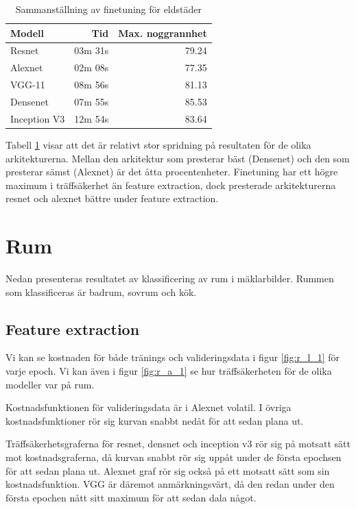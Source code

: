 \documentclass[]{kththesis}
\begin{document}
\begin{table}[!htbp]
  \centering
  \begin{tabular}{|l|r|r|}
    Modell & Tid & Max. noggrannhet \\ 
    \hline
    Resnet       & 03m 31s & 79.24 \\
    Alexnet      & 02m 08s & 77.35 \\
    VGG-11       & 08m 56s & 81.13 \\
    Densenet     & 07m 55s & 85.53 \\
    Inception V3 & 12m 54s & 83.64 \\
  \end{tabular}
  \caption{Sammanställning av finetuning för eldstäder}
  \label{fig:sam_4}  
\end{table}

Tabell \ref{fig:sam_4} visar att det är relativt stor spridning på resultaten för de olika arkitekturerna.
Mellan den arkitektur som presterar bäst (Densenet) och den som presterar sämst (Alexnet) är det åtta procentenheter.
Finetuning har ett högre maximum i träffsäkerhet än feature extraction, dock presterade arkitekturerna resnet och alexnet bättre under feature extraction.

\section{Rum}
Nedan presenteras resultatet av klassificering av rum i mäklarbilder. 
Rummen som klassificeras är badrum, sovrum och kök.


\subsection{Feature extraction}
Vi kan se kostnaden för både tränings och valideringsdata i figur \ref{fig:r_l_1} för varje epoch. Vi kan även  i figur \ref{fig:r_a_1} se hur träffsäkerheten för de olika modeller var på rum.

Kostnadsfunktionen för valideringsdata är i Alexnet volatil. 
I övriga kostnadsfunktioner rör sig kurvan snabbt nedåt för att sedan plana ut.

Träffsäkerhetsgraferna för resnet, densnet och inception v3 rör sig på motsatt sätt mot kostnadsgraferna, då kurvan snabbt rör sig uppåt under de första epochsen för att sedan plana ut.
Alexnet graf rör sig också på ett motsatt sätt som sin kostnadsfunktion. 
VGG är däremot anmärkningsvärt, då den redan under den första epochen nått sitt maximum för att sedan dala något.
\end{document}
